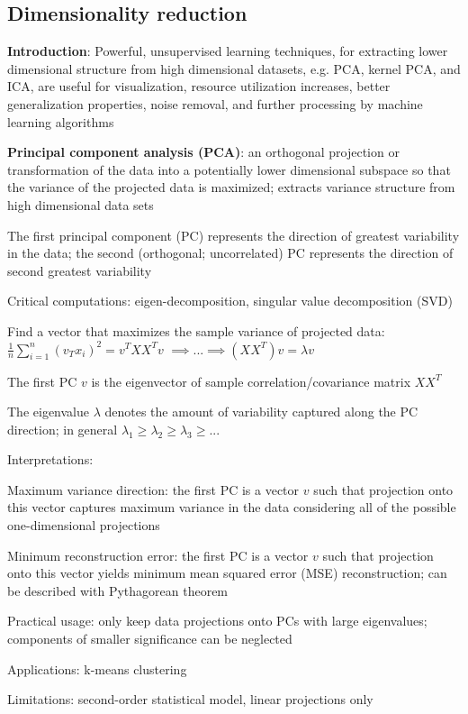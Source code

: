 \documentclass[letterpaper,fontsize=5pt]{scrartcl}
\renewenvironment{enumerate}[1]{\begin{compactenum}#1}{\end{compactenum}}
\theoremstyle{definition}
\begin{document}
\begin{multicols}{2}
\section{Dimensionality reduction}
	\begin{enumerate}
		\item \textbf{Introduction}: Powerful, unsupervised learning techniques, for extracting lower dimensional structure from high dimensional datasets, e.g. PCA, kernel PCA, and ICA, are useful for visualization, resource utilization increases, better generalization properties, noise removal, and further processing by machine learning algorithms
		\item \textbf{Principal component analysis (PCA)}: an orthogonal projection or transformation of the data into a potentially lower dimensional subspace so that the variance of the projected data is maximized; extracts variance structure from high dimensional data sets
			\begin{enumerate}
				\item The first principal component (PC) represents the direction of greatest variability in the data; the second (orthogonal; uncorrelated) PC represents the direction of second greatest variability
				\item Critical computations: eigen-decomposition, singular value decomposition (SVD)
				\item Find a vector that maximizes the sample variance of projected data: $\frac{1}{n} \sum\limits_{i=1}^n (v_T x_i)^2 = v^T X X^T v$ $\implies ... \implies (X X^T)v = \lambda v$
					\begin{enumerate}
						\item The first PC $v$ is the eigenvector of sample correlation/covariance matrix $X X^T$
						\item The eigenvalue $\lambda$ denotes the amount of variability captured along the PC direction; in general $\lambda_1 \geq \lambda_2 \geq \lambda_3 \geq ...$
					\end{enumerate}
				\item Interpretations:
					\begin{enumerate}
						\item Maximum variance direction: the first PC is a vector $v$ such that projection onto this vector captures maximum variance in the data considering all of the possible one-dimensional projections
						\item Minimum reconstruction error: the first PC is a vector $v$ such that projection onto this vector yields minimum mean squared error (MSE) reconstruction; can be described with Pythagorean theorem
					\end{enumerate}
				\item Practical usage: only keep data projections onto PCs with large eigenvalues; components of smaller significance can be neglected
				\item Applications: k-means clustering
				\item Limitations: second-order statistical model, linear projections only
			\end{enumerate}
	\end{enumerate}

\end{multicols}
\end{document}
